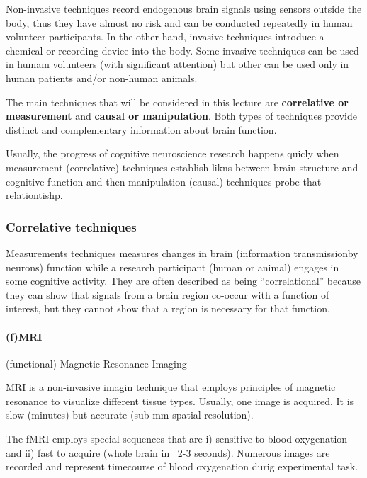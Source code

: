 \documentclass[12pt,article,oneside,a4paper]{memoir}
\begin{document}
Non-invasive techniques record endogenous brain signals using sensors outside the body, thus they have almost no risk and can be conducted repeatedly in human volunteer participants. In the other hand, invasive techniques introduce a chemical or recording device into the body. Some invasive techniques can be used in humam volunteers (with significant attention) but other can be used only in human patients and/or non-human animals.

The main techniques that will be considered in this lecture are \textbf{correlative or measurement} and \textbf{causal or manipulation}. Both types of techniques provide distinct and complementary information about brain function.

Usually, the progress of cognitive neuroscience research happens quicly when measurement (correlative) techniques establish likns between brain structure and cognitive function and then manipulation (causal) techniques probe that relationtishp.

\subsubsection{Correlative techniques}

Measurements techniques measures changes in brain (information transmissionby neurons) function while a research participant (human or animal) engages in some cognitive activity. They are often described as being ``correlational'' because they can show that signals from a brain region co-occur with a function of interest, but they cannot show that a region is necessary for that function.

\paragraph{(f)MRI} (functional) Magnetic Resonance Imaging

MRI is a non-invasive imagin technique that employs principles of magnetic resonance to visualize different tissue types. Usually, one image is acquired. It is slow (minutes) but accurate (sub-mm spatial resolution).

The fMRI employs special sequences that are i) sensitive to blood oxygenation and ii) fast to acquire (whole brain in ~2-3 seconds). Numerous images are recorded and represent timecourse of blood oxygenation durig experimental task.
\end{document}
